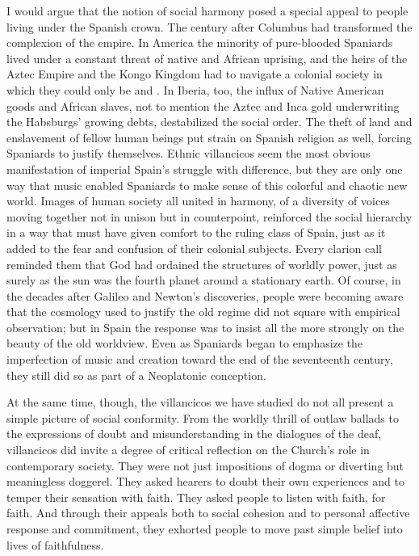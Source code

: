
I would argue that the notion of social harmony posed a special appeal to
people living under the Spanish crown.
The century after Columbus had transformed the complexion of the empire.
In America the minority of pure-blooded Spaniards lived under a constant threat
of native and African uprising, and the heirs of the Aztec Empire and the Kongo
Kingdom had to navigate a colonial society in which they could only be
 and .
In Iberia, too, the influx of Native American goods and African slaves, not to
mention the Aztec and Inca gold underwriting the Habsburgs' growing debts,
destabilized the social order.
The theft of land and enslavement of fellow human beings put strain on Spanish
religion as well, forcing Spaniards to justify themselves.
Ethnic villancicos seem the most obvious manifestation of imperial Spain's
struggle with difference, but they are only one way that music enabled
Spaniards to make sense of this colorful and chaotic new world.
Images of human society all united in harmony, of a diversity of voices moving
together not in unison but in counterpoint, reinforced the social hierarchy in
a way that must have given comfort to the ruling class of Spain, just as it
added to the fear and confusion of their colonial subjects.%
    \Autocites
    {Baker:Harmony}
    {Irving:Colonial}
    {Illari:Polychoral}
Every clarion call reminded them that God had ordained the structures of
worldly power, just as surely as the sun was the fourth planet around a
stationary earth.
Of course, in the decades after Galileo and Newton's discoveries, people were
becoming aware that the cosmology used to justify the old regime did not square
with empirical observation; but in Spain the response was to insist all the
more strongly on the beauty of the old worldview.
Even as Spaniards began to emphasize the imperfection of music and creation
toward the end of the seventeenth century, they still did so as part of a 
Neoplatonic conception.


At the same time, though, the villancicos we have studied do not all present a
simple picture of social conformity.
From the worldly thrill of  outlaw ballads to the expressions of
doubt and misunderstanding in the dialogues of the deaf, villancicos did invite
a degree of critical reflection on the Church's role in contemporary society.
They were not just impositions of dogma or diverting but meaningless doggerel.
They asked hearers to doubt their own experiences and to temper their sensation
with faith.
They asked people to listen with faith, for faith.
And through their appeals both to social cohesion and to personal affective
response and commitment, they exhorted people to move past simple belief into
lives of faithfulness.

